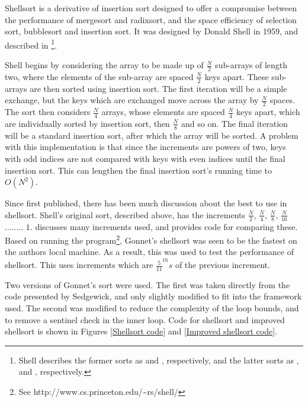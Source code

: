 \label{shell}

Shellsort is a derivative of insertion sort designed to offer a compromise
between the performance of mergesort and radixsort, and the space efficiency of
selection sort, bubblesort and insertion sort. It was designed by Donald Shell
in 1959, and described in \cite{Shell59}\footnote{Shell describes the former
sorts as  and , respectively, and the
latter sorts as ,  and
, respectively.}.

Shell begins by considering the array to be made up of $\frac{N}{2}$ sub-arrays
of length two, where the elements of the sub-array are spaced $\frac{N}{2}$ keys
apart. These sub-arrays are then sorted using insertion sort. The first
iteration will be a simple exchange, but the keys which are exchanged move
across the array by $\frac{N}{2}$ spaces. The sort then considers $\frac{N}{4}$
arrays, whose elements are spaced $\frac{N}{4}$ keys apart, which are
individually sorted by insertion sort, then $\frac{N}{8}$ and so on. The final
iteration will be a standard insertion sort, after which the array will be
sorted. A problem with this implementation is that since the increments are
powers of two, keys with odd indices are not compared with keys with even
indices until the final insertion sort. This can lengthen the final insertion
sort's running time to $O(N^2)$.

Since first published, there has been much discussion about the best
 to use in shellsort. Shell's original sort, described above,
has the increments $\frac{N}{2}$, $\frac{N}{4}$, $\frac{N}{8}$, $\frac{N}{16}$
........ $1$. \cite{Sedgewick96} discusses many increments used, and provides
code for comparing these. Based on running the  program\footnote{See
http://www.cs.princeton.edu/\textasciitilde{}rs/shell/}, Gonnet's shellsort was
seen to be the fastest on the authors local machine. As a result, this was used
to test the performance of shellsort. This uses increments which are
$\frac{5}{11}^{th}s$ of the previous increment.

Two versions of Gonnet's sort were used. The first was taken directly from the
code presented by Sedgewick, and only slightly modified to fit into the
framework used. The second was modified to reduce the complexity of the loop
bounds, and to remove a sentinel check in the inner loop. Code for shellsort and
improved shellsort is shown in Figures \ref{Shellsort code} and \ref{Improved
shellsort code}.


